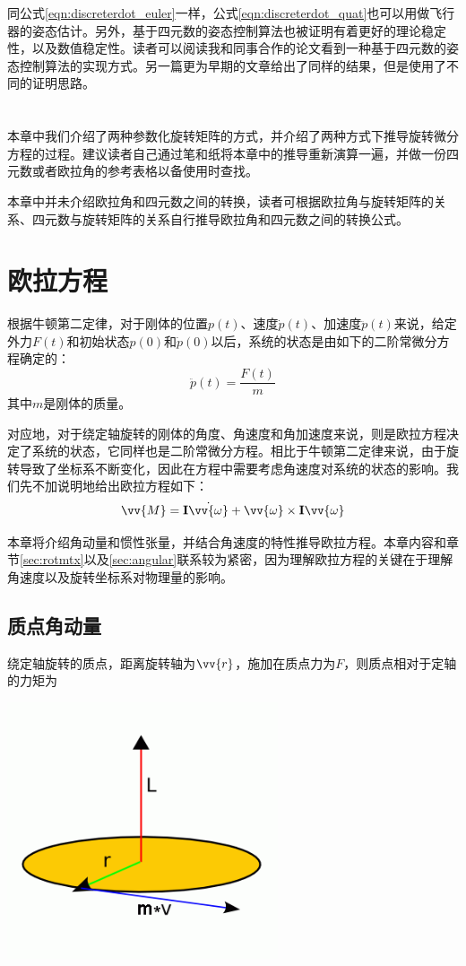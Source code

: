 \documentclass[11pt]{article}
\begin{document}
同公式\ref{eqn:discreterdot_euler}一样，公式\ref{eqn:discreterdot_quat}也可以用做飞行器的姿态估计。另外，基于四元数的姿态控制算法也被证明有着更好的理论稳定性，以及数值稳定性。读者可以阅读我和同事合作的论文\cite{7139416}看到一种基于四元数的姿态控制算法的实现方式。另一篇更为早期的文章\cite{5717652}给出了同样的结果，但是使用了不同的证明思路。
\ \\
\ \\
\ \\
本章中我们介绍了两种参数化旋转矩阵的方式，并介绍了两种方式下推导旋转微分方程的过程。建议读者自己通过笔和纸将本章中的推导重新演算一遍，并做一份四元数或者欧拉角的参考表格以备使用时查找。

本章中并未介绍欧拉角和四元数之间的转换，读者可根据欧拉角与旋转矩阵的关系、四元数与旋转矩阵的关系自行推导欧拉角和四元数之间的转换公式。

\section{欧拉方程}\label{sec:euler}
​根据牛顿第二定律，对于刚体的位置$p(t)$、速度$\dot{p}(t)$、加速度$\ddot{p}(t)$来说，给定外力$F(t)$和初始状态$p(0)$和$\dot{p}(0)$以后，系统的状态是由如下的二阶常微分方程确定的：
\begin{equation}\label{eqn:newton2}
\ddot{p}(t) = \frac{F(t)}{m}
\end{equation}
其中$m$是刚体的质量。

对应地，对于绕定轴旋转的刚体的角度、角速度和角加速度来说，则是欧拉方程决定了系统的状态，它同样也是二阶常微分方程。相比于牛顿第二定律来说，由于旋转导致了坐标系不断变化，因此在方程中需要考虑角速度对系统的状态的影响。我们先不加说明地给出欧拉方程如下：
\begin{equation}
\vv{M} = {\bf I}\dot{\vv{\omega}} + \vv{\omega} \times {\bf I}\vv{\omega}
\end{equation}


本章将介绍角动量和惯性张量，并结合角速度的特性推导欧拉方程。本章内容和章节\ref{sec:rotmtx}以及\ref{sec:angular}联系较为紧密，因为理解欧拉方程的关键在于理解角速度以及旋转坐标系对物理量的影响。
\subsection{质点角动量}
绕定轴旋转的质点，距离旋转轴为$\vv{r}$，施加在质点力为$F$，则质点相对于定轴的力矩为

\begin{center}
\includegraphics[width=0.6\textwidth]{images/angularmomentum.png}
\end{center}
\end{document}
